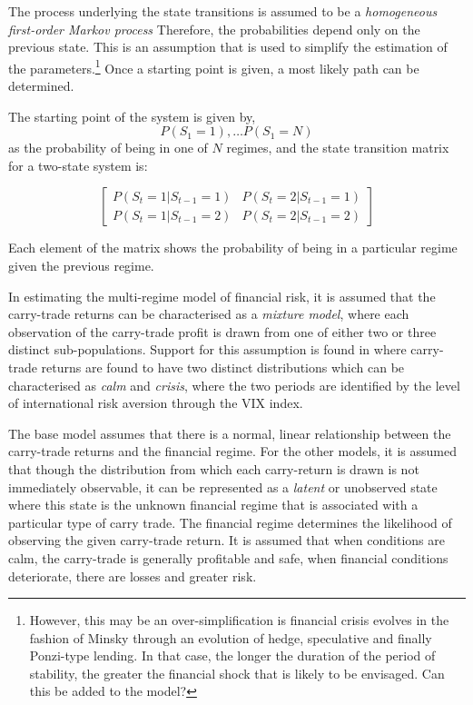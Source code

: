 \documentclass[12pt, a4paper, oneside]{article} %
\begin{document}
The process underlying the state transitions is assumed to be a \emph{homogeneous first-order Markov process}  Therefore, the probabilities depend only on the previous state. This is an assumption that is used to simplify the estimation of the parameters.\footnote{However, this may be an over-simplification is financial crisis evolves in the fashion of Minsky through an evolution of hedge, speculative and finally Ponzi-type lending. In that case, the longer the duration of the period of stability, the greater the financial shock that is likely to be envisaged.  Can this be added to the model?} Once a starting point is given, a most likely path can be determined. 


The starting point of the system is given by,
\begin{equation*}
P(S_1 = 1), \dots P(S_1 = N)
\end{equation*}
as the probability of being in one of $N$ regimes, and the state transition matrix for a two-state system is:

\begin{equation*}
\begin{bmatrix}
P(S_t = 1|S_{t-1}=1)  & P(S_t = 2|S_{t-1}=1)\\
P(S_t = 1|S_{t-1}=2)  & P(S_t = 2|S_{t-1}=2)
\end{bmatrix}
\end{equation*}

Each element of the matrix shows the probability of being in a particular regime given the previous regime. 

In estimating the multi-regime model of financial risk, it is assumed that the carry-trade returns can be characterised as a \emph{mixture model}, where each observation of the carry-trade profit is drawn from one of either two or three distinct sub-populations.   Support for this assumption is found in \citet{Hayward2013} where carry-trade returns are found to have two distinct distributions which can be characterised as \emph{calm} and \emph{crisis}, where the two periods are identified by the level of international risk aversion through the VIX index. 

The base model assumes that there is a normal, linear relationship between the carry-trade returns and the financial regime. For the other models, it is assumed that though the distribution from which each carry-return is drawn is not immediately observable, it can be represented as a \emph{latent} or unobserved state where this state is the unknown financial regime that is associated with a particular type of carry trade.  The financial regime determines the likelihood of observing the given carry-trade return.  It is assumed that when conditions are calm, the carry-trade is generally profitable and safe, when financial conditions deteriorate, there are losses and greater risk. 
\end{document}
